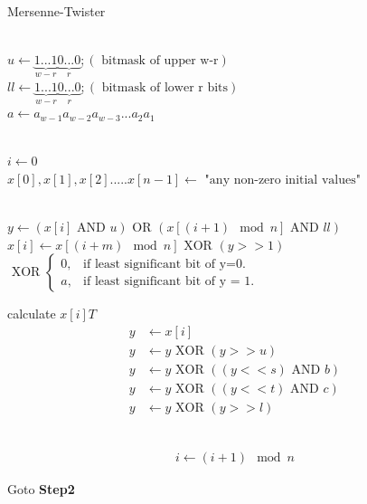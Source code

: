 \documentclass[conference]{IEEEtran}
\begin{document}
\begin{algorithm}                      %
\caption{Mersenne-Twister}
\label{alg_mersenne_twister}                           %
\begin{algorithmic}                    %
    
    
     \\
    $u \leftarrow \underbrace{1...1}_{w-r}\underbrace{0...0}_{r}; (\text{ bitmask of upper w-r})$ \\ 
    $ll \leftarrow \underbrace{1...1}_{w-r}\underbrace{0...0}_{r}; (\text{ bitmask of lower r bits})$ \\
    $a \leftarrow a_{w-1}a_{w-2}a_{w-3}...a_{2}a_{1}$
    
    \\
    $i \leftarrow 0$ \\
    $x[0], x[1], x[2].....x[n-1]\leftarrow \text{ "any non-zero initial values"}$
    
    \\
    $y \leftarrow (x[i] \text{ AND }u) \text{ OR } (x[(i+1) \mod n] \text{ AND }ll)$ \\
    
    $x[i] \leftarrow x[(i+m) \mod n] \text{ XOR } (y>>1)$ \\
    	$
		\text{ XOR } \begin{cases}
					0, & \text{if least significant bit of y=0}.\\
    					a, & \text{if least significant bit of y = 1}.
				\end{cases}
    	$
    
     calculate $x[i]T$ \\ 
    \begin{align*}
    	y &\leftarrow x[i]\\
	y &\leftarrow y \text{ XOR } (y>>u) \\
	y &\leftarrow y \text{ XOR } ((y<<s) \text{ AND } b) \\
	y &\leftarrow y \text{ XOR } ((y << t) \text{ AND } c) \\
	y &\leftarrow y \text{ XOR } (y >> l)
\end{align*}
    
     \\
    \begin{align*}
    	i \leftarrow (i+1) \mod n
    \end{align*}
    
    Goto {\bf Step2}
\end{algorithmic}
\end{algorithm}
\end{document}
